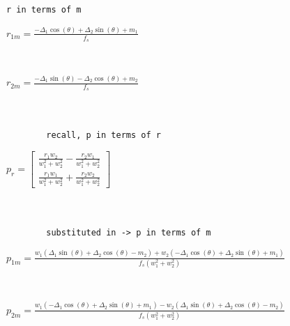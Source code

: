 \documentclass[11pt]{article}
\begin{document}
            \begin{Verbatim}[commandchars=\\\{\}]
        r in terms of m
            \end{Verbatim}

            $\displaystyle r_{1 m} = \frac{- \Delta_{1} \cos{\left(\theta \right)} + \Delta_{2} \sin{\left(\theta \right)} + m_{1}}{f_{s}}$

            
            \begin{Verbatim}[commandchars=\\\{\}]


            \end{Verbatim}

            $\displaystyle r_{2 m} = \frac{- \Delta_{1} \sin{\left(\theta \right)} - \Delta_{2} \cos{\left(\theta \right)} + m_{2}}{f_{s}}$

            
            \begin{Verbatim}[commandchars=\\\{\}]


        recall, p in terms of r
            \end{Verbatim}

            $\displaystyle p_{r} = \left[\begin{matrix}\frac{r_{1} w_{2}}{w_{1}^{2} + w_{2}^{2}} - \frac{r_{2} w_{1}}{w_{1}^{2} + w_{2}^{2}}\\\frac{r_{1} w_{1}}{w_{1}^{2} + w_{2}^{2}} + \frac{r_{2} w_{2}}{w_{1}^{2} + w_{2}^{2}}\end{matrix}\right]$

            
            \begin{Verbatim}[commandchars=\\\{\}]


        substituted in -> p in terms of m
            \end{Verbatim}

            $\displaystyle p_{1 m} = \frac{w_{1} \left(\Delta_{1} \sin{\left(\theta \right)} + \Delta_{2} \cos{\left(\theta \right)} - m_{2}\right) + w_{2} \left(- \Delta_{1} \cos{\left(\theta \right)} + \Delta_{2} \sin{\left(\theta \right)} + m_{1}\right)}{f_{s} \left(w_{1}^{2} + w_{2}^{2}\right)}$

            
            \begin{Verbatim}[commandchars=\\\{\}]


            \end{Verbatim}

            $\displaystyle p_{2 m} = \frac{w_{1} \left(- \Delta_{1} \cos{\left(\theta \right)} + \Delta_{2} \sin{\left(\theta \right)} + m_{1}\right) - w_{2} \left(\Delta_{1} \sin{\left(\theta \right)} + \Delta_{2} \cos{\left(\theta \right)} - m_{2}\right)}{f_{s} \left(w_{1}^{2} + w_{2}^{2}\right)}$

            
            \begin{Verbatim}[commandchars=\\\{\}]


            \end{Verbatim}


            
            
            
\end{document}
